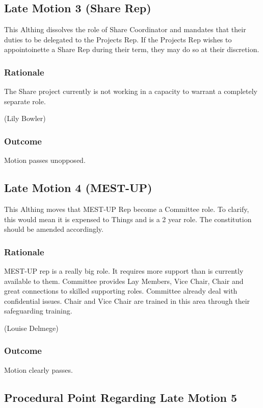 \documentclass[a4paper, 11pt]{article} %
\begin{document}
\subsection{Late Motion 3 (Share Rep)}
This Althing dissolves the role of Share Coordinator and mandates that their duties to be delegated to the Projects Rep.  If the Projects Rep wishes to appointoinette a Share Rep during their term, they may do so at their discretion.

\subsubsection{Rationale}
The Share project currently is not working in a capacity to warrant a completely separate role.

(Lily Bowler)

\subsubsection{Outcome}

Motion passes unopposed.

\subsection{Late Motion 4 (MEST-UP)}
This Althing moves that MEST-UP Rep become a Committee role.  To clarify, this would mean it is expensed to Things and is a 2 year role.  The constitution should be amended accordingly.

\subsubsection{Rationale}
MEST-UP rep is a really big role.  It requires more support than is currently available to them.  Committee provides Lay Members, Vice Chair, Chair and great connections to skilled supporting roles.  Committee already deal with confidential issues.  Chair and Vice Chair are trained in this area through their safeguarding training.

(Louise Delmege)

\subsubsection{Outcome}

Motion clearly passes.

\subsection{Procedural Point Regarding Late Motion 5}
\end{document}
